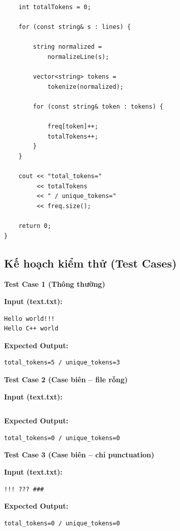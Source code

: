 \begin{lstlisting}
    int totalTokens = 0;

    for (const string& s : lines) {

        string normalized =
            normalizeLine(s);

        vector<string> tokens =
            tokenize(normalized);

        for (const string& token : tokens) {

            freq[token]++;
            totalTokens++;
        }
    }

    cout << "total_tokens="
         << totalTokens
         << " / unique_tokens="
         << freq.size();

    return 0;
}
\end{lstlisting}

\subsection{Kế hoạch kiểm thử (Test Cases)}

\textbf{Test Case 1 (Thông thường)}

\textbf{Input (text.txt):}

\begin{lstlisting}
Hello world!!!
Hello C++ world
\end{lstlisting}

\textbf{Expected Output:}

\begin{lstlisting}
total_tokens=5 / unique_tokens=3
\end{lstlisting}

\vspace{0.5cm}

\textbf{Test Case 2 (Case biên -- file rỗng)}

\textbf{Input (text.txt):}

\begin{lstlisting}

\end{lstlisting}

\textbf{Expected Output:}

\begin{lstlisting}
total_tokens=0 / unique_tokens=0
\end{lstlisting}

\vspace{0.5cm}

\textbf{Test Case 3 (Case biên -- chỉ punctuation)}

\textbf{Input (text.txt):}

\begin{lstlisting}
!!! ??? ###
\end{lstlisting}

\textbf{Expected Output:}

\begin{lstlisting}
total_tokens=0 / unique_tokens=0
\end{lstlisting}